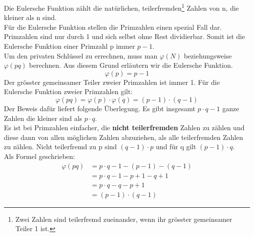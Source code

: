 Die Eulersche Funktion zählt die natürlichen, teilerfremden\footnote{Zwei Zahlen sind teilerfremd zueinander, wenn ihr grösster gemeinsamer Teiler 1 ist.}  Zahlen von n, die kleiner als n sind.\\
Für die Eulersche Funktion stellen die Primzahlen einen spezial Fall dar.
Primzahlen sind nur durch 1 und sich selbst ohne Rest dividierbar. Somit ist die Eulersche Funktion einer Primzahl p immer $p - 1$.\\
Um den privaten Schlüssel zu errechnen, muss man $\varphi(N)$ beziehungsweise $\varphi(pq)$ berechnen. Aus diesem Grund erläutern wir die Eulersche Funktion.
%
\begin{equation*}
  \varphi(p) = p - 1
\end{equation*}
%
Der grösster gemeinsamer Teiler zweier Primzahlen ist immer 1.
Für die Eulersche Funktion zweier Primzahlen gilt:
\begin{equation}
  \varphi(pq) = \varphi(p) \cdot \varphi(q) = (p - 1) \cdot (q - 1)
  \label{eqn:eulersche_func}
\end{equation}
Der Beweis dafür liefert folgende Überlegung. Es gibt insgesamt $p \cdot q -1$ ganze Zahlen die kleiner sind als $p \cdot q$.\\
Es ist bei Primzahlen einfacher, die \textbf{nicht teilerfremden} Zahlen zu zählen und diese dann von allen möglichen Zahlen abzuziehen, als alle teilerfremden Zahlen zu zählen. Nicht teilerfremd zu p sind $(q - 1) \cdot p$ und für q gilt $ (p - 1) \cdot q$. \cite{kryptologie}\\
Als Formel geschrieben:
%
\begin{equation*}
  \begin{split}
    \varphi(pq) & = p \cdot q -1 - (p - 1) - (q - 1)  \\
     & = p \cdot q -1 - p + 1 - q + 1  \\
     & = p \cdot q -q - p + 1  \\
     & = (p -1) \cdot (q - 1)
    \label{eqn:herleitung_eulersche_func}
  \end{split}
\end{equation*}
%
